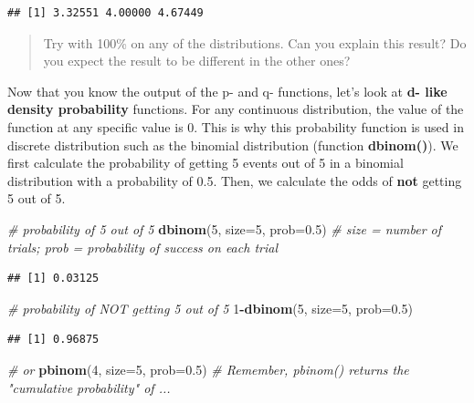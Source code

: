 \documentclass[
]{book}
\newenvironment{Shaded}{\begin{snugshade}}{\end{snugshade}}
\newcommand{\AttributeTok}[1]{\textcolor[rgb]{0.13,0.29,0.53}{#1}}
\newcommand{\CommentTok}[1]{\textcolor[rgb]{0.56,0.35,0.01}{\textit{#1}}}
\newcommand{\DecValTok}[1]{\textcolor[rgb]{0.00,0.00,0.81}{#1}}
\newcommand{\FloatTok}[1]{\textcolor[rgb]{0.00,0.00,0.81}{#1}}
\newcommand{\FunctionTok}[1]{\textcolor[rgb]{0.13,0.29,0.53}{\textbf{#1}}}
\newcommand{\NormalTok}[1]{#1}
\newcommand{\SpecialCharTok}[1]{\textcolor[rgb]{0.81,0.36,0.00}{\textbf{#1}}}
\begin{document}
\begin{verbatim}
## [1] 3.32551 4.00000 4.67449
\end{verbatim}

\begin{quote}
Try with 100\% on any of the distributions. Can you explain this result? Do you expect the result to be different in the other ones?
\end{quote}

Now that you know the output of the p- and q- functions, let's look at \textbf{d- like density probability} functions. For any continuous distribution, the value of the function at any specific value is 0. This is why this probability function is used in discrete distribution such as the binomial distribution (function \textbf{dbinom()}). We first calculate the probability of getting 5 events out of 5 in a binomial distribution with a probability of 0.5. Then, we calculate the odds of \textbf{not} getting 5 out of 5.

\begin{Shaded}
\begin{Highlighting}[]
\CommentTok{\# probability of 5 out of 5}
\FunctionTok{dbinom}\NormalTok{(}\DecValTok{5}\NormalTok{, }\AttributeTok{size=}\DecValTok{5}\NormalTok{, }\AttributeTok{prob=}\FloatTok{0.5}\NormalTok{) }\CommentTok{\# size = number of trials; prob = probability of success on each trial}
\end{Highlighting}
\end{Shaded}

\begin{verbatim}
## [1] 0.03125
\end{verbatim}

\begin{Shaded}
\begin{Highlighting}[]
\CommentTok{\# probability of NOT getting 5 out of 5}
\DecValTok{1}\SpecialCharTok{{-}}\FunctionTok{dbinom}\NormalTok{(}\DecValTok{5}\NormalTok{, }\AttributeTok{size=}\DecValTok{5}\NormalTok{, }\AttributeTok{prob=}\FloatTok{0.5}\NormalTok{) }
\end{Highlighting}
\end{Shaded}

\begin{verbatim}
## [1] 0.96875
\end{verbatim}

\begin{Shaded}
\begin{Highlighting}[]
\CommentTok{\# or}
\FunctionTok{pbinom}\NormalTok{(}\DecValTok{4}\NormalTok{, }\AttributeTok{size=}\DecValTok{5}\NormalTok{, }\AttributeTok{prob=}\FloatTok{0.5}\NormalTok{) }\CommentTok{\# Remember, pbinom() returns the "cumulative probability" of ...}
\end{Highlighting}
\end{Shaded}
\end{document}
